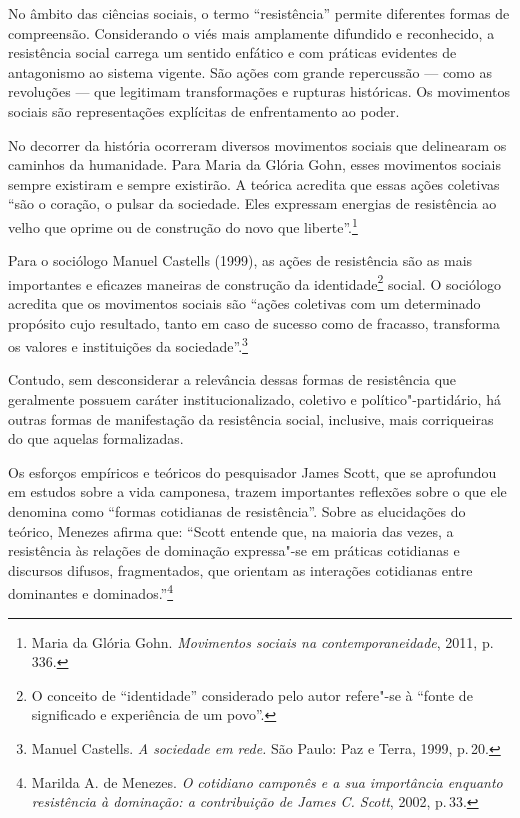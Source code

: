 No âmbito das ciências sociais, o termo ``resistência'' permite
diferentes formas de compreensão. Considerando o viés mais amplamente
difundido e reconhecido, a resistência social carrega um sentido
enfático e com práticas evidentes de antagonismo ao sistema vigente. São
ações com grande repercussão --- como as revoluções --- que legitimam
transformações e rupturas históricas. Os movimentos sociais são
representações explícitas de enfrentamento ao poder.

No decorrer da história ocorreram diversos movimentos sociais que
delinearam os caminhos da humanidade. Para Maria da Glória Gohn,
esses movimentos sociais sempre existiram e sempre existirão. A teórica
acredita que essas ações coletivas ``são o coração, o pulsar da
sociedade. Eles expressam energias de resistência ao velho que oprime ou
de construção do novo que liberte''.\footnote{Maria da Glória Gohn. \textit{Movimentos sociais na contemporaneidade}, 2011, p.\,336.}

Para o sociólogo Manuel Castells (1999), as ações de resistência são as
mais importantes e eficazes maneiras de construção da
identidade\footnote{O conceito de ``identidade'' considerado pelo autor
  refere"-se à ``fonte de significado e experiência de um povo''.} social.
O sociólogo acredita que os movimentos sociais são ``ações coletivas com
um determinado propósito cujo resultado, tanto em caso de sucesso como
de fracasso, transforma os valores e instituições da sociedade''.\footnote{Manuel Castells. \textit{A sociedade em rede.} São Paulo: Paz e Terra, 1999, p.\,20.}

Contudo, sem desconsiderar a relevância dessas formas de resistência que
geralmente possuem caráter institucionalizado, coletivo e
político"-partidário, há outras formas de manifestação da resistência
social, inclusive, mais corriqueiras do que aquelas formalizadas.

Os esforços empíricos e teóricos do pesquisador James Scott, que se
aprofundou em estudos sobre a vida camponesa, trazem importantes
reflexões sobre o que ele denomina como ``formas cotidianas de
resistência''. Sobre as elucidações do teórico, Menezes
afirma que: ``Scott entende que, na maioria das vezes, a resistência às
relações de dominação expressa"-se em práticas cotidianas e discursos
difusos, fragmentados, que orientam as interações cotidianas entre
dominantes e dominados.''\footnote{Marilda A. de Menezes. \textit{O cotidiano camponês e a sua importância enquanto resistência à dominação: a contribuição de James C. Scott}, 2002, p.\,33.}

